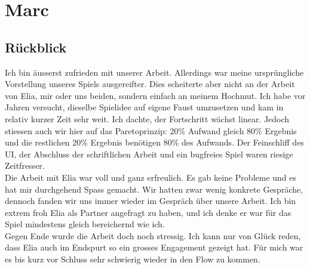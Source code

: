 \chapter{Marc}

\section{Rückblick}
Ich bin äusserst zufrieden mit unserer Arbeit.
Allerdings war meine ursprüngliche Vorstellung unseres Spiels ausgereifter.
Dies scheiterte aber nicht an der Arbeit von Elia, mir oder uns beiden, sondern einfach an meinem Hochmut.
Ich habe vor Jahren versucht, dieselbe Spielidee auf eigene Faust umzusetzen und kam in relativ kurzer Zeit sehr weit.
Ich dachte, der Fortschritt wächst linear.
Jedoch stiessen auch wir hier auf das Paretoprinzip: 20\% Aufwand gleich 80\% Ergebnis und die restlichen 20\% Ergebnis benötigen 80\% des Aufwands.
Der Feinschliff des UI, der Abschluss der schriftlichen Arbeit und ein bugfreies Spiel waren riesige Zeitfresser. \\
Die Arbeit mit Elia war voll und ganz erfreulich.
Es gab keine Probleme und es hat mir durchgehend Spass gemacht.
Wir hatten zwar wenig konkrete Gespräche, dennoch fanden wir uns immer wieder im Gespräch über unsere Arbeit.
Ich bin extrem froh Elia als Partner angefragt zu haben, und ich denke er war für das Spiel mindestens gleich bereichernd wie ich. \\
Gegen Ende wurde die Arbeit doch noch stressig.
Ich kann nur von Glück reden, dass Elia auch im Endspurt so ein grosses Engagement gezeigt hat.
Für mich war es bis kurz vor Schluss sehr schwierig wieder in den Flow zu kommen.

